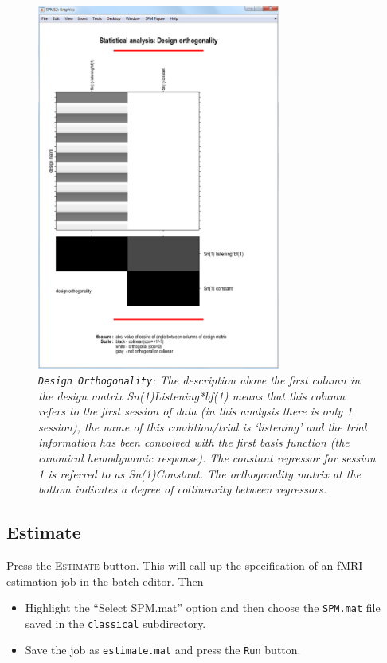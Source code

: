 \begin{figure}
\begin{center}
\includegraphics[width=80mm]{auditory/aud_orth}
\caption{\emph{\texttt{Design Orthogonality}: The description above the first column in the design matrix {\sf Sn(1)Listening*bf(1)} means that this column refers to the first session of data (in this analysis there is only 1 session), the name of this condition/trial is `listening' and the trial information has been convolved with the first basis function (the canonical hemodynamic response). The constant regressor for session 1 is referred to as {\sf Sn(1)Constant}. The orthogonality matrix at the bottom indicates a degree of collinearity between regressors. \label{aud_orth}}}
\end{center}
\end{figure}

\subsection{Estimate}

Press the \textsc{Estimate} button. This will call up the specification of an fMRI estimation job in the batch editor. Then

\begin{itemize}
\item Highlight the ``Select SPM.mat'' option and then choose the \texttt{SPM.mat} file saved in the \texttt{classical} subdirectory.
\item Save the job as \texttt{estimate.mat} and press the \texttt{Run} button.
\end{itemize}

